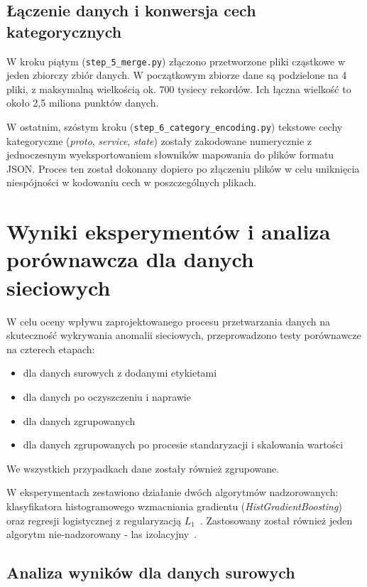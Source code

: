 \documentclass[12pt,twoside]{article}
\begin{document}
\subsection{Łączenie danych i konwersja cech kategorycznych}

W kroku piątym (\texttt{step\_5\_merge.py}) złączono przetworzone pliki cząstkowe w jeden zbiorczy zbiór danych.
W początkowym zbiorze dane są podzielone na 4 pliki, z maksymalną wielkością ok. 700 tysiecy rekordów.
Ich łączna wielkość to około 2,5 miliona punktów danych.

W ostatnim, szóstym kroku (\texttt{step\_6\_category\_encoding.py}) tekstowe cechy kategoryczne (\emph{proto}, \emph{service}, \emph{state}) zostały zakodowane numerycznie z jednoczesnym wyeksportowaniem słowników mapowania do plików formatu JSON. 
Proces ten został dokonany dopiero po złączeniu plików w celu uniknięcia niespójności w kodowaniu cech w poszczególnych plikach. 

\section{Wyniki eksperymentów i analiza porównawcza dla danych sieciowych}

W celu oceny wpływu zaprojektowanego procesu przetwarzania danych na skuteczność wykrywania anomalii sieciowych, przeprowadzono testy porównawcze na czterech etapach:
\begin{itemize}
\item dla danych surowych z dodanymi etykietami
\item dla danych po oczyszczeniu i naprawie
\item dla danych zgrupowanych
\item dla danych zgrupowanych po procesie standaryzacji i skalowania wartości
\end{itemize}
We wszystkich przypadkach dane zostały również zgrupowane.

W eksperymentach zestawiono działanie dwóch algorytmów nadzorowanych: klasyfikatora histogramowego wzmacniania gradientu (\emph{HistGradientBoosting})~\cite{bib:histogramowe} oraz regresji logistycznej z regularyzacją $L_1$~\cite{bib:regresja}.
Zastosowany został również jeden algorytm nie-nadzorowany - las izolacyjny~\cite{bib:las}.

\subsection{Analiza wyników dla danych surowych}
\end{document}
